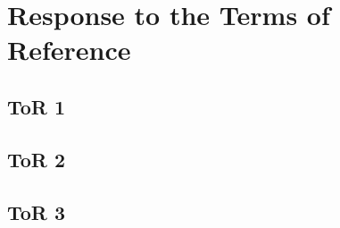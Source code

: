 \chapter{Response to the Terms of Reference}
\label{ch:tor}


\section{ToR 1}
\label{sec:tor:1}

\lipsum[1]

\section{ToR 2}
\label{sec:tor:2}

\lipsum[2]

\section{ToR 3}
\label{sec:tor:3}

\lipsum[3]
